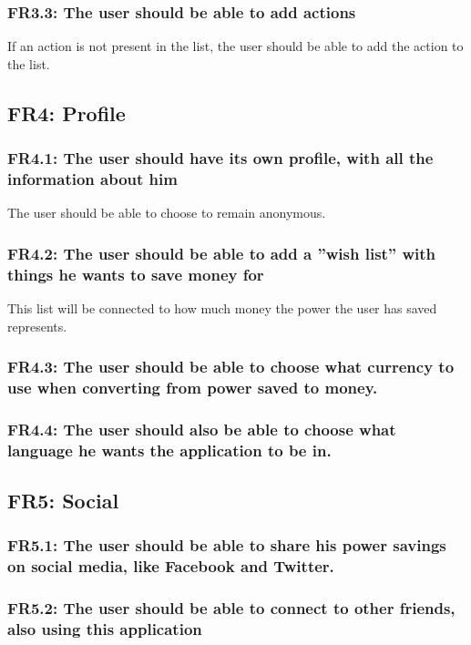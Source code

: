 \subsubsection{FR3.3: The user should be able to add actions}
If an action is not present in the list, the user should be able to add the action to the list.



\subsection{FR4: Profile}

\subsubsection{FR4.1: The user should have its own profile, with all the information about him}
The user should be able to choose to remain anonymous.

\subsubsection{FR4.2: The user should be able to add a ''wish list'' with things he wants to save money for}
This list will be connected to how much money the power the user has saved represents.

\subsubsection{FR4.3: The user should be able to choose what currency to use when converting from power saved to money.}

\subsubsection{FR4.4: The user should also be able to choose what language he wants the application to be in.}


\subsection{FR5: Social}
\subsubsection{FR5.1: The user should be able to share his power savings on social media, like Facebook and Twitter.}

\subsubsection{FR5.2: The user should be able to connect to other friends, also using this application}

